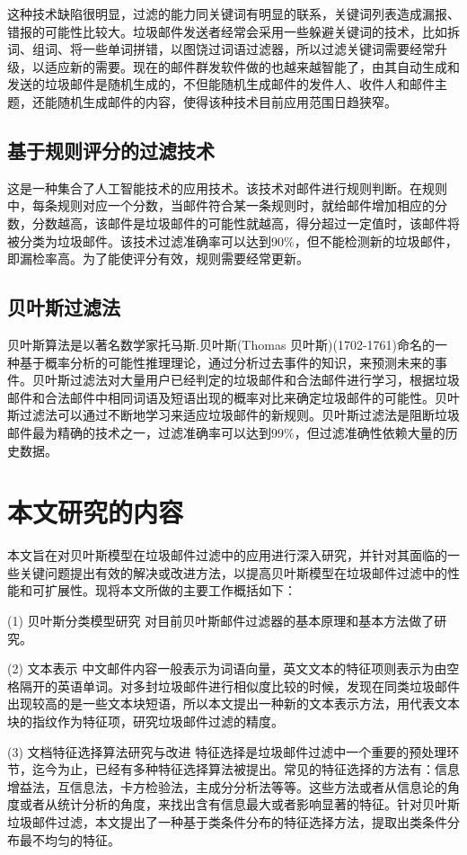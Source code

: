 这种技术缺陷很明显，过滤的能力同关键词有明显的联系，关键词列表造成漏报、错报的可能性比较大。垃圾邮件发送者经常会采用一些躲避关键词的技术，比如拆词、组词、将一些单词拼错，以图饶过词语过滤器，所以过滤关键词需要经常升级，以适应新的需要。现在的邮件群发软件做的也越来越智能了，由其自动生成和发送的垃圾邮件是随机生成的，不但能随机生成邮件的发件人、收件人和邮件主题，还能随机生成邮件的内容，使得该种技术目前应用范围日趋狭窄。
\subsection{基于规则评分的过滤技术}
这是一种集合了人工智能技术的应用技术。该技术对邮件进行规则判断。在规则 中，每条规则对应一个分数，当邮件符合某一条规则时，就给邮件增加相应的分数，分数越高，该邮件是垃圾邮件的可能性就越高，得分超过一定值时，该邮件将被分类为垃圾邮件。该技术过滤准确率可以达到90\%，但不能检测新的垃圾邮件，即漏检率高。为了能使评分有效，规则需要经常更新。
\subsection{贝叶斯过滤法}
贝叶斯算法是以著名数学家托马斯.贝叶斯(Thomas 贝叶斯)(1702-1761)命名的一 种基于概率分析的可能性推理理论，通过分析过去事件的知识，来预测未来的事件。贝叶斯过滤法对大量用户已经判定的垃圾邮件和合法邮件进行学习，根据垃圾邮件和合法邮件中相同词语及短语出现的概率对比来确定垃圾邮件的可能性。贝叶斯过滤法可以通过不断地学习来适应垃圾邮件的新规则。贝叶斯过滤法是阻断垃圾邮件最为精确的技术之一，过滤准确率可以达到99\%，但过滤准确性依赖大量的历史数据。
\section{本文研究的内容}
本文旨在对贝叶斯模型在垃圾邮件过滤中的应用进行深入研究，并针对其面临的一些关键问题提出有效的解决或改进方法，以提高贝叶斯模型在垃圾邮件过滤中的性能和可扩展性。现将本文所做的主要工作概括如下：  

(1) 贝叶斯分类模型研究   对目前贝叶斯邮件过滤器的基本原理和基本方法做了研究。  

(2) 文本表示   中文邮件内容一般表示为词语向量，英文文本的特征项则表示为由空格隔开的英语单词。对多封垃圾邮件进行相似度比较的时候，发现在同类垃圾邮件出现较高的是一些文本块短语，所以本文提出一种新的文本表示方法，用代表文本块的指纹作为特征项，研究垃圾邮件过滤的精度。  

(3) 文档特征选择算法研究与改进  特征选择是垃圾邮件过滤中一个重要的预处理环节，迄今为止，已经有多种特征选择算法被提出。常见的特征选择的方法有：信息增益法，互信息法，卡方检验法，主成分分析法等等。这些方法或者从信息论的角度或者从统计分析的角度，来找出含有信息最大或者影响显著的特征。针对贝叶斯垃圾邮件过滤，本文提出了一种基于类条件分布的特征选择方法，提取出类条件分布最不均匀的特征。 

